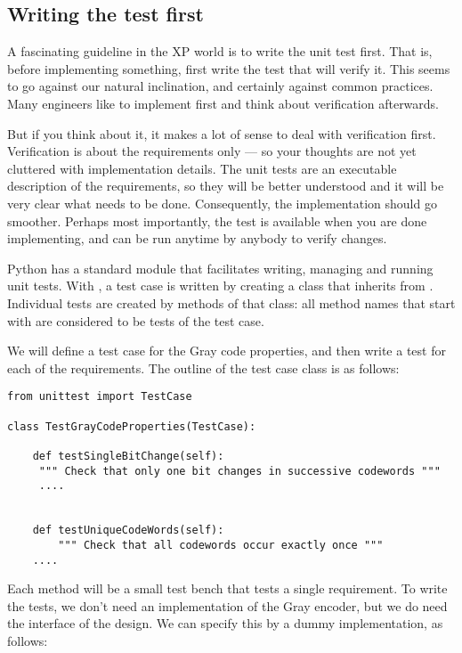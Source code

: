 \subsection{Writing the test first \label{unittest-first}}

A fascinating guideline in the XP world is to write the unit test
first. That is, before implementing something, first write the test
that will verify it. This seems to go against our natural inclination,
and certainly against common practices. Many engineers like to
implement first and think about verification afterwards.

But if you think about it, it makes a lot of sense to deal with
verification first. Verification is about the requirements only --- so
your thoughts are not yet cluttered with implementation details. The
unit tests are an executable description of the requirements, so they
will be better understood and it will be very clear what needs to be
done. Consequently, the implementation should go smoother. Perhaps
most importantly, the test is available when you are done
implementing, and can be run anytime by anybody to verify changes.

Python has a standard  module that facilitates writing,
managing and running unit tests. With , a test case is 
written by creating a class that inherits from
. Individual tests are created by methods of
that class: all method names that start with  are
considered to be tests of the test case.

We will define a test case for the Gray code properties, and then
write a test for each of the requirements. The outline of the test
case class is as follows:

\begin{verbatim}
from unittest import TestCase

class TestGrayCodeProperties(TestCase):

    def testSingleBitChange(self):
     """ Check that only one bit changes in successive codewords """
     ....


    def testUniqueCodeWords(self):
        """ Check that all codewords occur exactly once """
    ....
\end{verbatim}

Each method will be a small test bench that tests a single
requirement. To write the tests, we don't need an implementation of
the Gray encoder, but we do need the interface of the design. We can
specify this by a dummy implementation, as follows:

